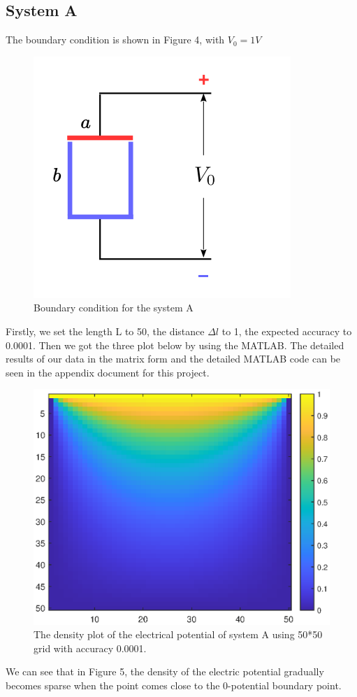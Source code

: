 \documentclass[12pt]{report}
\begin{document}
\subsection{System A}
The boundary condition is shown in Figure 4, with $V_{0}=1V$
\begin{figure}[H]
    \centering
    \includegraphics[width=0.3\linewidth]{3.png}
    \caption{Boundary condition for the system A}
    \label{fig:my_label}
\end{figure}
Firstly, we set the length L to 50, the distance $\Delta l$ to 1, the expected accuracy to 0.0001. Then we got the three plot below by using the MATLAB. The detailed results of our data in the matrix form and the detailed MATLAB code can be seen in the appendix document for this project. 
\begin{figure}[H]
    \centering
    \includegraphics[width=0.8\linewidth]{A00001Density.eps}
    \caption{The density plot of the electrical potential of system A using 50*50 grid with accuracy 0.0001.}
\end{figure}
We can see that in Figure 5, the density of the electric potential gradually becomes sparse when the point comes close to the 0-potential boundary point.
\end{document}
